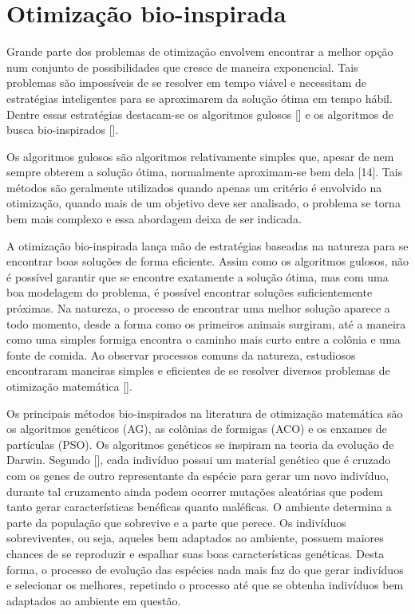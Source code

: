 \chapter[Otimização bio-inspirada]{Otimização bio-inspirada}

Grande parte dos problemas de otimização envolvem encontrar a melhor opção num conjunto de possibilidades que cresce de maneira exponencial. Tais problemas são impossíveis de se resolver em tempo viável e necessitam de estratégias inteligentes para se aproximarem da solução ótima em tempo hábil. Dentre essas estratégias destacam-se os algoritmos gulosos [] e os algoritmos de busca bio-inspirados [].

Os algoritmos gulosos são algoritmos relativamente simples que, apesar de nem sempre obterem a solução ótima, normalmente aproximam-se bem dela [14]. Tais métodos são geralmente utilizados quando apenas um critério é envolvido na otimização, quando mais de um objetivo deve ser analisado, o problema se torna bem mais complexo e essa abordagem deixa de ser indicada.

A otimização bio-inspirada lança mão de estratégias baseadas na natureza para se encontrar boas soluções de forma eficiente. Assim como os algoritmos gulosos, não é possível garantir que se encontre exatamente a solução ótima, mas com uma boa modelagem do problema, é possível encontrar soluções suficientemente próximas. Na natureza, o processo de encontrar uma melhor solução aparece a todo momento, desde a forma como os primeiros animais surgiram, até a maneira como uma simples formiga encontra o caminho mais curto entre a colônia e uma fonte de comida. Ao observar processos comuns da natureza, estudiosos encontraram maneiras simples e eficientes de se resolver diversos problemas de otimização matemática [].

Os principais métodos bio-inspirados na literatura de otimização matemática são os algoritmos genéticos (AG), as colônias de formigas (ACO) e os enxames de partículas (PSO). Os algoritmos genéticos se inspiram na teoria da evolução de Darwin. Segundo [], cada indivíduo possui um material genético que é cruzado com os genes de outro representante da espécie para gerar um novo indivíduo, durante tal cruzamento ainda podem ocorrer mutações aleatórias que podem tanto gerar características benéficas quanto maléficas. O ambiente determina a parte da população que sobrevive e a parte que perece. Os indivíduos sobreviventes, ou seja, aqueles bem adaptados ao ambiente, possuem maiores chances de se reproduzir e espalhar suas boas características genéticas. Desta forma, o processo de evolução das espécies nada mais faz do que gerar indivíduos e selecionar os melhores, repetindo o processo até que se obtenha indivíduos bem adaptados ao ambiente em questão. 

